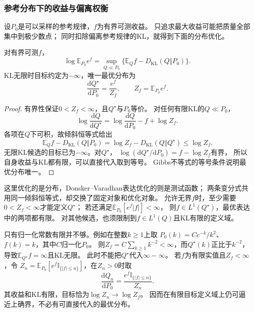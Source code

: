\subsubsection{参考分布下的收益与偏离权衡}
\label{sec:information-gibbs-optimization}

设\(P_0\)是可以采样的参考规律，\(f\)为有界可测收益。
只追求最大收益可能把质量全部集中到极少数点；
同时扣除偏离参考规律的KL，就得到下面的分布优化。
\begin{theorem}[Gibbs变分式]
\label{thm:information-gibbs-variational}
对有界可测\(f\)，
\begin{equation}
  \log\mathbb E_{P_0}e^f
  =\sup_{Q\ll P_0}\{\mathbb E_Qf-D_{\mathrm{KL}}(Q\Vert P_0)\}.
  \label{eq:information-gibbs-variational}
\end{equation}
KL无限时目标约定为\(-\infty\)，唯一最优分布为
\[
  \frac{\mathrm dQ^\star}{\mathrm dP_0}
  =\frac{e^f}{Z_f},\qquad Z_f=\mathbb E_{P_0}e^f.
\]
\end{theorem}
\begin{proof}
有界性保证\(0<Z_f<\infty\)，且\(Q^\star\)与\(P_0\)等价。
对任何有限KL的\(Q\ll P_0\)，
\[
  \log\frac{\mathrm dQ}{\mathrm dQ^\star}
  =\log\frac{\mathrm dQ}{\mathrm dP_0}-f+\log Z_f.
\]
各项在\(Q\)下可积，故倾斜恒等式给出
\[
  \mathbb E_Qf-D_{\mathrm{KL}}(Q\Vert P_0)
  =\log Z_f-D_{\mathrm{KL}}(Q\Vert Q^\star)\leq\log Z_f.
\]
无限KL候选的目标已为\(-\infty\)。对\(Q^\star\)，
\(\log(\mathrm dQ^\star/\mathrm dP_0)=f-\log Z_f\)有界，
所以自身收益与KL都有限，可以直接代入取到等号。
Gibbs不等式的等号条件说明最优分布唯一。
\end{proof}

这里优化的是分布，Donsker--Varadhan表达优化的则是测试函数；
两条变分式共用同一倾斜恒等式，却交换了固定对象和优化对象。
允许无界\(f\)时，至少需要\(0<Z_f<\infty\)才能定义\(Q^\star\)；
若还满足\(\mathbb E_{P_0}[e^f|f|]<\infty\)，
则\(f\in L^1(Q^\star)\)，最优表达中的两项都有限。
对其他候选，也须限制到\(f\in L^1(Q)\)且KL有限的定义域。

只有归一化常数有限并不够。例如在整数\(k\geq1\)上取
\(P_0(k)=C e^{-k}/k^2\)、\(f(k)=k\)，其中\(C\)归一化\(P_0\)。
则\(Z_f=C\sum_{k\geq1}k^{-2}<\infty\)，而\(Q^\star(k)\)正比于\(k^{-2}\)，
导致\(\mathbb E_{Q^\star}f=\infty\)且KL无限。
此时不能把\(Q^\star\)代入\(\infty-\infty\)。
若\(f\)为有限实值且\(Z_f<\infty\)，令
\(Z_n=\mathbb E_{P_0}[e^f\mathbb I_{\{|f|\leq n\}}]\)，在\(Z_n>0\)时取
\[
  \frac{\mathrm dQ_n}{\mathrm dP_0}
  =\frac{e^f\mathbb I_{\{|f|\leq n\}}}{Z_n}.
\]
其收益和KL有限，目标恰为\(\log Z_n\to\log Z_f\)。
因而在有限目标定义域上仍可逼近上确界，不必有可直接代入的最优分布。

